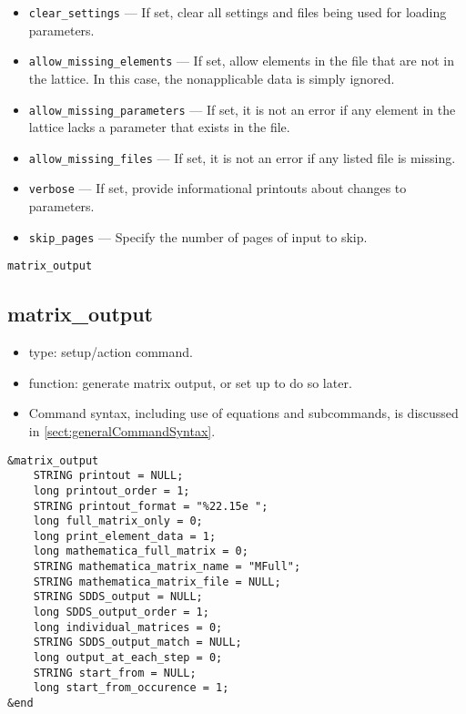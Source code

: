 \documentclass[11pt]{article}
\begin{document}
\begin{itemize}
\item \verb|clear_settings| --- If set, clear all settings and files
being used for loading parameters.

\item \verb|allow_missing_elements| --- If set, allow elements in the
file that are not in the lattice.  In this case, the nonapplicable
data is simply ignored.

\item \verb|allow_missing_parameters| --- If set, it is not an error
if any element in the lattice lacks a parameter that exists in the file.

\item \verb|allow_missing_files| --- If set, it is not an error
if any listed file is missing.

\item \verb|verbose| --- If set, provide informational printouts about
changes to parameters.

\item \verb|skip_pages| --- Specify the number of pages of input to skip.

\end{itemize}

\newpage
\begin{center}{\Large\verb|matrix_output|}\end{center}
\subsection{matrix\_output \label{subsec:matrixoutput}}

\begin{itemize}
\item type: setup/action command.
\item function: generate matrix output, or set up to do so later.
\item Command syntax, including use of equations and subcommands, is discussed in \ref{sect:generalCommandSyntax}.
\end{itemize}

\begin{verbatim}
&matrix_output
    STRING printout = NULL;
    long printout_order = 1;
    STRING printout_format = "%22.15e ";
    long full_matrix_only = 0;
    long print_element_data = 1;
    long mathematica_full_matrix = 0;
    STRING mathematica_matrix_name = "MFull";
    STRING mathematica_matrix_file = NULL;
    STRING SDDS_output = NULL;
    long SDDS_output_order = 1;
    long individual_matrices = 0;
    STRING SDDS_output_match = NULL;
    long output_at_each_step = 0;
    STRING start_from = NULL;
    long start_from_occurence = 1;
&end
\end{verbatim}
\end{document}
